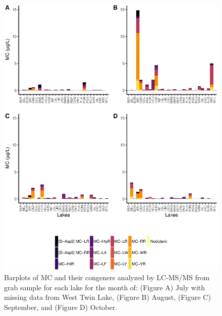 \begin{figure}[p] 
	\includegraphics[width=\textwidth]{figures/month}
	\caption{
Barplots of MC and their congeners analyzed by LC-MS/MS from grab sample for each lake for the month of: 
(Figure A) July with missing data from West Twin Lake, 
(Figure B) August,
(Figure C) September, and
(Figure D) October. 
}
	\label{fig:month} 
\end{figure}


